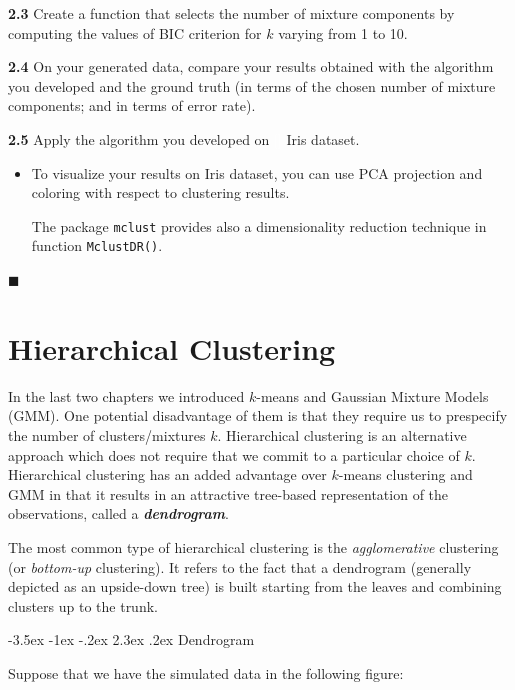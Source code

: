 \documentclass[]{book}
\makeatletter
\newenvironment{rmdblock}[1]
  {\begin{shaded*}
  \begin{itemize}
  \renewcommand{\labelitemi}{
    \raisebox{-.7\height}[0pt][0pt]{
      {\setkeys{Gin}{width=2em,keepaspectratio}\texttt{[image: img/icons/\#1]}}
    }
  }
  \item
  }
  {
  \end{itemize}
  \end{shaded*}
  }
\newenvironment{rmdinsight}
  {\begin{rmdblock}{insight}}
  {\end{rmdblock}}
\renewcommand\section{\@startsection {section}{1}{\z@}%
                                   {-3.5ex \@plus -1ex \@minus -.2ex}%
                                   {2.3ex \@plus.2ex}%
                                   {\normalfont\Large\bfseries\color{ForestGreen}}}
\theoremstyle{definition}
\theoremstyle{definition}
\theoremstyle{definition}
\theoremstyle{remark}
\makeatother
\begin{document}
\textbf{2.3} Create a function that selects the number of mixture
components by computing the values of BIC criterion for \(k\) varying
from 1 to 10.

\textbf{2.4} On your generated data, compare your results obtained with
the algorithm you developed and the ground truth (in terms of the chosen
number of mixture components; and in terms of error rate).

\textbf{2.5} Apply the algorithm you developed on
\textcolor{white}{[}\faTable\textcolor{white}{]} Iris dataset.

\begin{rmdinsight}
To visualize your results on Iris dataset, you can use PCA projection
and coloring with respect to clustering results.

The package \texttt{mclust} provides also a dimensionality reduction
technique in function \texttt{MclustDR()}.
\end{rmdinsight}

◼

\chapter{Hierarchical Clustering}\label{hierarchical-clustering}

In the last two chapters we introduced \(k\)-means and Gaussian Mixture
Models (GMM). One potential disadvantage of them is that they require us
to prespecify the number of clusters/mixtures \(k\). Hierarchical
clustering is an alternative approach which does not require that we
commit to a particular choice of \(k\). Hierarchical clustering has an
added advantage over \(k\)-means clustering and GMM in that it results
in an attractive tree-based representation of the observations, called a
\textbf{\emph{dendrogram}}.

The most common type of hierarchical clustering is the
\emph{agglomerative} clustering (or \emph{bottom-up} clustering). It
refers to the fact that a dendrogram (generally depicted as an
upside-down tree) is built starting from the leaves and combining
clusters up to the trunk.

\section{Dendrogram}\label{dendrogram}

Suppose that we have the simulated data in the following figure:
\end{document}
